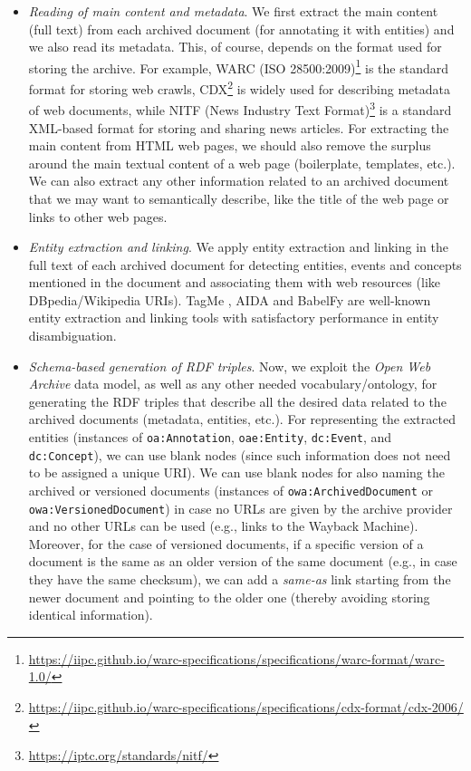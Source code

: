 \documentclass[twocolumn]{svjour3}
\begin{document}
\begin{itemize}
\item
{\em Reading of main content and metadata}.
We first extract the main content (full text) from
each archived document (for annotating it with entities) and
we also read its metadata.
This, of course, depends on the format used for
storing the archive. For example,
WARC (ISO 28500:2009)\footnote{\url{https://iipc.github.io/warc-specifications/specifications/warc-format/warc-1.0/}} is the standard format for storing web crawls,
CDX\footnote{\url{https://iipc.github.io/warc-specifications/specifications/cdx-format/cdx-2006/}} is widely used for describing metadata of web documents,
while NITF (News Industry Text Format)\footnote{\url{https://iptc.org/standards/nitf/}} is a standard
XML-based format for storing and sharing news articles.
For extracting the main content from HTML web pages,
we should also remove the surplus
around the main textual content of a web page (boilerplate, templates, etc.).
We can also extract any other information related to an archived document
that we may want to semantically describe, like the title of the web page or
links to other web pages.

\item
{\em Entity extraction and linking}.
We apply entity extraction and linking in the full text of each
archived document for detecting entities, events and concepts
mentioned in the document and associating them with web resources
(like DBpedia/Wikipedia URIs).
TagMe \cite{ferragina2010tagme},
AIDA \cite{hoffart2011robust} and
BabelFy \cite{moro2014entity} are
well-known entity extraction and linking tools with
 satisfactory performance in entity disambiguation.

\item
{\em Schema-based generation of RDF triples}.
Now, we exploit the {\em Open Web Archive} data model, as well
as any other needed vo\-ca\-bu\-la\-ry/onto\-lo\-gy, for
generating the RDF triples that
describe all the desired data related
to the archived documents (metadata, entities, etc.).
For representing the extracted entities (instances of {\tt oa:Annotation},
 {\tt oae:\-Entity}, {\tt dc:\-Event}, and {\tt dc:\-Concept}),
we can use blank nodes \cite{beckett2004rdf}
(since such information does not need to be assigned a unique URI).
We can use blank nodes for also naming the
archived or versioned documents (instances of {\tt owa:Archi\-ved\-Do\-cu\-ment} or
{\tt owa:\-Ve\-rsionedDo\-cu\-ment}) in case no URLs are given by the archive provider
and no other URLs can be used (e.g., links to the Wayback Machine).
Moreover,
for the case of versioned documents,
if a specific version of a document is the
same as an older version of the same document
(e.g., in case they have the same checksum),
we can add a {\em same-as} link
starting from the newer document and pointing to
the older one (thereby avoiding storing identical information).



\end{itemize}
\end{document}
